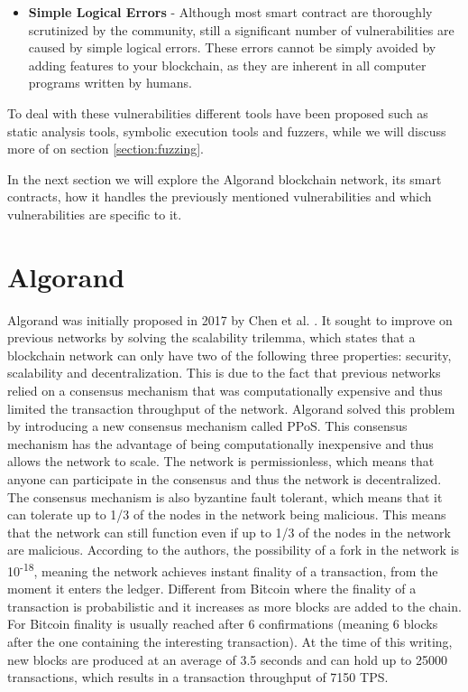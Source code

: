 \begin{itemize}
    \item \textbf{Simple Logical Errors} - Although most smart contract are thoroughly scrutinized by the community, still a significant number of vulnerabilities are caused by simple logical errors. These errors cannot be simply avoided by adding features to your blockchain, as they are inherent in all computer programs written by humans.
\end{itemize}

To deal with these vulnerabilities different tools have been proposed such as static analysis tools, symbolic execution tools and fuzzers, while we will discuss more of on section \ref{section:fuzzing}.

In the next section we will explore the Algorand blockchain network, its smart contracts, how it handles the previously mentioned vulnerabilities and which vulnerabilities are specific to it.

\section{Algorand} \label{section:algorand}
Algorand was initially proposed in 2017 by Chen et al. \cite{chen_algorand_2017}. It sought to improve on previous networks by solving the scalability trilemma, which states that a blockchain network can only have two of the following three properties: security, scalability and decentralization. This is due to the fact that previous networks relied on a consensus mechanism that was computationally expensive and thus limited the transaction throughput of the network. Algorand solved this problem by introducing a new consensus mechanism called \ac{PPoS}. This consensus mechanism has the advantage of being computationally inexpensive and thus allows the network to scale. The network is permissionless, which means that anyone can participate in the consensus and thus the network is decentralized. The consensus mechanism is also byzantine fault tolerant, which means that it can tolerate up to 1/3 of the nodes in the network being malicious. This means that the network can still function even if up to 1/3 of the nodes in the network are malicious. According to the authors, the possibility of a fork in the network is 10\textsuperscript{-18}, meaning the network achieves instant finality of a transaction, from the moment it enters the ledger. Different from Bitcoin where the finality of a transaction is probabilistic and it increases as more blocks are added to the chain. For Bitcoin finality is usually reached after 6 confirmations (meaning 6 blocks after the one containing the interesting transaction). At the time of this writing, new blocks are produced at an average of 3.5 seconds and can hold up to 25000 transactions, which results in a transaction throughput of 7150 \ac{TPS}.

